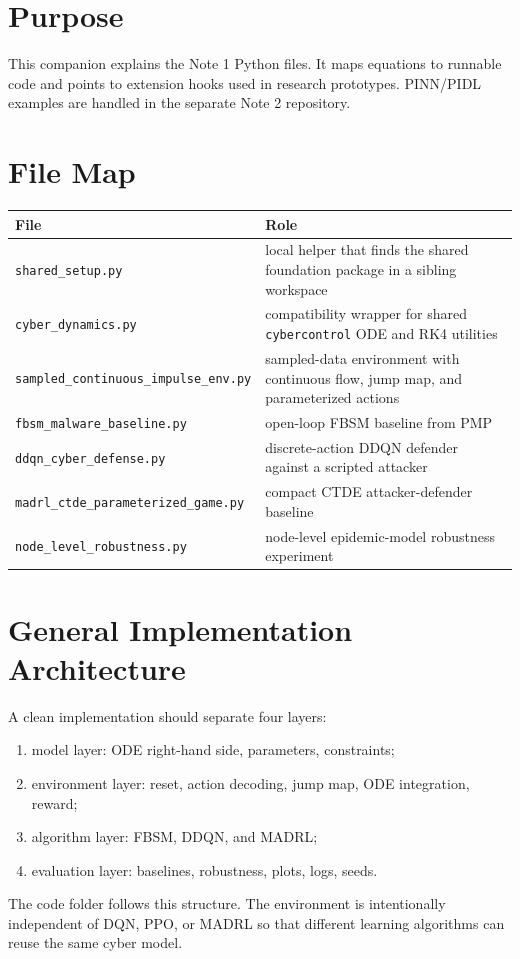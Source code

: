 \documentclass[11pt,a4paper]{article}
\begin{document}
\tableofcontents
\newpage

\section{Purpose}
This companion explains the Note 1 Python files. It maps equations to runnable code and points to extension hooks used in research prototypes. PINN/PIDL examples are handled in the separate Note 2 repository.

\section{File Map}
\begin{longtable}{p{}p{}}
\toprule
File & Role \\
\midrule
\small\texttt{shared\_setup.py} & local helper that finds the shared foundation package in a sibling workspace \\
\small\texttt{cyber\_dynamics.py} & compatibility wrapper for shared \texttt{cybercontrol} ODE and RK4 utilities \\
\small\texttt{sampled\_continuous}\newline\small\texttt{\_impulse\_env.py} & sampled-data environment with continuous flow, jump map, and parameterized actions \\
\small\texttt{fbsm\_malware\_baseline.py} & open-loop FBSM baseline from PMP \\
\small\texttt{ddqn\_cyber\_defense.py} & discrete-action DDQN defender against a scripted attacker \\
\small\texttt{madrl\_ctde}\newline\small\texttt{\_parameterized\_game.py} & compact CTDE attacker-defender baseline \\
\small\texttt{node\_level\_robustness.py} & node-level epidemic-model robustness experiment \\
\bottomrule
\end{longtable}

\section{General Implementation Architecture}
A clean implementation should separate four layers:
\begin{enumerate}
\item model layer: ODE right-hand side, parameters, constraints;
\item environment layer: reset, action decoding, jump map, ODE integration, reward;
\item algorithm layer: FBSM, DDQN, and MADRL;
\item evaluation layer: baselines, robustness, plots, logs, seeds.
\end{enumerate}
The code folder follows this structure. The environment is intentionally independent of DQN, PPO, or MADRL so that different learning algorithms can reuse the same cyber model.
\end{document}
